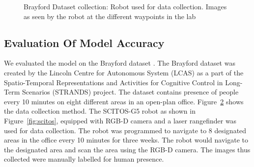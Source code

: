 \begin{figure}
\begin{subfigure}[b]{0.6\textwidth}
        \caption{}
        \label{fig:robot-view}
    \end{subfigure}
    \caption[Brayford dataset collection]{Brayford Dataset collection: \cite{SCITOS_G5} Robot used for data collection. Images  as seen by the robot at the different waypoints in the lab \citep{krajnik_wheres_2015} }\label{fig:brayford-dataset}
\end{figure}

\FloatBarrier
\subsection{Evaluation Of Model Accuracy}

We evaluated the model on the Brayford dataset \citep{krajnik2014long}. The Brayford dataset was created by the Lincoln Centre for Autonomous System (LCAS) as a part of the Spatio-Temporal Representations and Activities for Cognitive Control in Long-Term Scenarios (STRANDS) project. The dataset contains presence of people every 10 minutes on eight different areas in an open-plan office.
 Figure~\ref{fig:brayford-dataset} shows the data collection method. The SCITOS-G5 robot as shown in Figure~\ref{fig:scitos}, equipped with RGB-D camera and a laser rangefinder was used for data collection. The robot was programmed to navigate to 8 designated areas in the office every 10 minutes for three weeks. The robot would navigate to the designated area and scan the area using the RGB-D camera. The images thus collected were manually labelled for human presence.  

